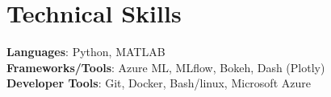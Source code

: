 \documentclass[letterpaper,11pt]{article}
\begin{document}
%
\section{Technical Skills}
 \begin{itemize}[leftmargin=0.15in, label={}]
    \small{\item{
     \textbf{Languages}{: Python, MATLAB} \\
     \textbf{Frameworks/Tools}{: Azure ML, MLflow, Bokeh, Dash (Plotly)} \\
     \textbf{Developer Tools}{: Git, Docker, Bash/linux, Microsoft Azure} \\
    }}
 \end{itemize}


\end{document}
